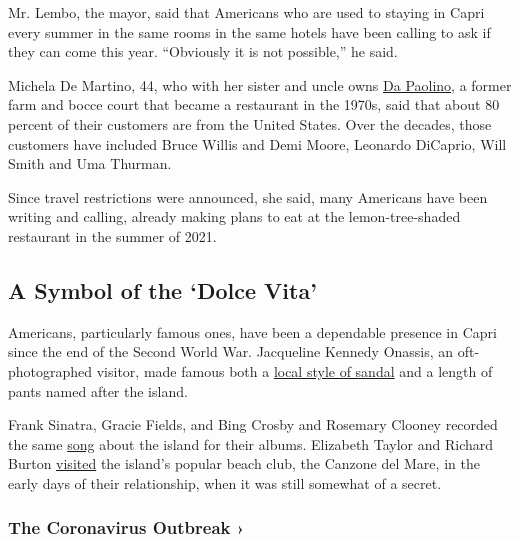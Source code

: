 Mr. Lembo, the mayor, said that Americans who are used to staying in
Capri every summer in the same rooms in the same hotels have been
calling to ask if they can come this year. ``Obviously it is not
possible,'' he said.

Michela De Martino, 44, who with her sister and uncle owns
\href{https://paolinocapri.com/en/}{Da Paolino}, a former farm and bocce
court that became a restaurant in the 1970s, said that about 80 percent
of their customers are from the United States. Over the decades, those
customers have included Bruce Willis and Demi Moore, Leonardo DiCaprio,
Will Smith and Uma Thurman.

Since travel restrictions were announced, she said, many Americans have
been writing and calling, already making plans to eat at the
lemon-tree-shaded restaurant in the summer of 2021.

\hypertarget{a-symbol-of-the-dolce-vita}{%
\subsection{A Symbol of the `Dolce
Vita'}\label{a-symbol-of-the-dolce-vita}}

Americans, particularly famous ones, have been a dependable presence in
Capri since the end of the Second World War. Jacqueline Kennedy Onassis,
an oft-photographed visitor, made famous both a
\href{https://footwearnews.com/2016/fashion/designers/canfaro-capri-sandals-jackie-kennedy-onassis-style-shoes-207293/}{local
style of sandal} and a length of pants named after the island.

Frank Sinatra, Gracie Fields, and Bing Crosby and Rosemary Clooney
recorded the same
\href{https://www.youtube.com/watch?v=vzD8YHhdv3w}{song} about the
island for their albums. Elizabeth Taylor and Richard Burton
\href{https://www.dailymail.co.uk/tvshowbiz/article-1277881/Dame-Gracie-Field-auction-Unseen-picture-Elizabeth-Taylor-Richard-Burton.html}{visited}
the island's popular beach club, the Canzone del Mare, in the early days
of their relationship, when it was still somewhat of a secret.

\href{https://www.nytimes3xbfgragh.onion/news-event/coronavirus?action=click\&pgtype=Article\&state=default\&region=MAIN_CONTENT_3\&context=storylines_faq}{}

\hypertarget{the-coronavirus-outbreak-}{%
\subsubsection{The Coronavirus Outbreak
›}\label{the-coronavirus-outbreak-}}


